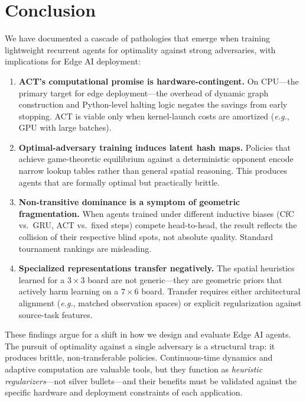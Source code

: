 \documentclass[conference]{IEEEtran}
\newcommand{\eg}{\textit{e.g.}}
\begin{document}
\section{Conclusion}
\label{sec:conclusion}

We have documented a cascade of pathologies that emerge when training lightweight recurrent agents for optimality against strong adversaries, with implications for Edge AI deployment:

\begin{enumerate}
    \item \textbf{ACT's computational promise is hardware-contingent.} On CPU---the primary target for edge deployment---the overhead of dynamic graph construction and Python-level halting logic negates the savings from early stopping. ACT is viable only when kernel-launch costs are amortized (\eg, GPU with large batches).

    \item \textbf{Optimal-adversary training induces latent hash maps.} Policies that achieve game-theoretic equilibrium against a deterministic opponent encode narrow lookup tables rather than general spatial reasoning. This produces agents that are formally optimal but practically brittle.

    \item \textbf{Non-transitive dominance is a symptom of geometric fragmentation.} When agents trained under different inductive biases (CfC vs.\ GRU, ACT vs.\ fixed steps) compete head-to-head, the result reflects the collision of their respective blind spots, not absolute quality. Standard tournament rankings are misleading.

    \item \textbf{Specialized representations transfer negatively.} The spatial heuristics learned for a $3 \times 3$ board are not generic---they are geometric priors that actively harm learning on a $7 \times 6$ board. Transfer requires either architectural alignment (\eg, matched observation spaces) or explicit regularization against source-task features.
\end{enumerate}

These findings argue for a shift in how we design and evaluate Edge AI agents. The pursuit of optimality against a single adversary is a structural trap: it produces brittle, non-transferable policies. Continuous-time dynamics and adaptive computation are valuable tools, but they function as \emph{heuristic regularizers}---not silver bullets---and their benefits must be validated against the specific hardware and deployment constraints of each application.
\end{document}
